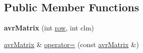 \subsection*{Public Member Functions}
\begin{DoxyCompactItemize}
\item 
\hypertarget{classavr_matrix_a46991bd48c86dae9b1d8a987381e1401}{{\bfseries avr\-Matrix} (int \hyperlink{classavr_matrix_a3e27175e91c4565f66ec6e590fc86520}{row}, int clm)}\label{classavr_matrix_a46991bd48c86dae9b1d8a987381e1401}

\item 
\hypertarget{classavr_matrix_ad3ab687c2493bf5729923091794b6a58}{\hyperlink{classavr_matrix}{avr\-Matrix} \& \hyperlink{classavr_matrix_ad3ab687c2493bf5729923091794b6a58}{operator=} (const \hyperlink{classavr_matrix}{avr\-Matrix} \&)}\label{classavr_matrix_ad3ab687c2493bf5729923091794b6a58}


\end{DoxyCompactItemize}
